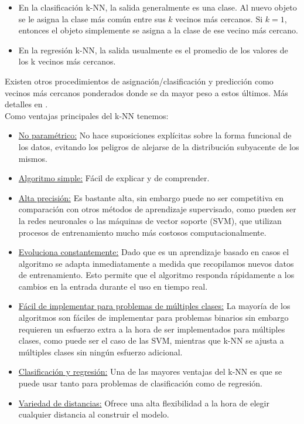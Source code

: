 \documentclass[12pt]{report} %
\theoremstyle{definition}
\begin{document}
\begin{itemize}
	\item En la clasificación k-NN, la salida generalmente es una clase. Al nuevo objeto se le asigna la clase más común entre sus $k$ vecinos más cercanos. Si $k = 1$, entonces el objeto simplemente se asigna a la clase de ese vecino más cercano.
	\item En la regresión k-NN, la salida usualmente es el promedio de los valores de los k vecinos más cercanos.
\end{itemize}

Existen otros procedimientos de asignación/clasificación y predicción como vecinos más cercanos ponderados donde se da mayor peso a estos últimos. Más detalles en \cite{weightedknn}.\\

\noindent Como ventajas principales del k-NN tenemos:
\begin{itemize}
	\item \underline{No paramétrico:} No hace suposiciones explícitas sobre la forma funcional de los datos, evitando los peligros de alejarse de la distribución subyacente de los mismos.
	\item \underline{Algoritmo simple:} Fácil de explicar y de comprender.
	\item \underline{Alta precisión:} Es bastante alta, sin embargo puede no ser competitiva en comparación con otros métodos de aprendizaje supervisado, como pueden ser la redes neuronales o las máquinas de vector soporte (SVM), que utilizan procesos de entrenamiento mucho más costosos computacionalmente.
	\item \underline{Evoluciona constantemente:} Dado que es un aprendizaje basado en casos el algoritmo se adapta inmediatamente a medida que recopilamos nuevos datos de entrenamiento. Esto permite que el algoritmo responda rápidamente a los cambios en la entrada durante el uso en tiempo real.
	\item  \underline{Fácil de implementar para problemas de múltiples clases:} La mayoría de los algoritmos son fáciles de implementar para problemas binarios sin embargo requieren un esfuerzo extra a la hora de ser implementados para múltiples clases, como puede ser el caso de las SVM, mientras que k-NN se ajusta a múltiples clases sin ningún esfuerzo adicional.
	\item \underline{Clasificación y regresión:} Una de las mayores ventajas del k-NN es que se puede usar tanto para problemas de clasificación como de regresión.
	\item \underline{Variedad de distancias:} Ofrece una alta flexibilidad a la hora de elegir cualquier distancia al construir el modelo.
\end{itemize}
\end{document}
